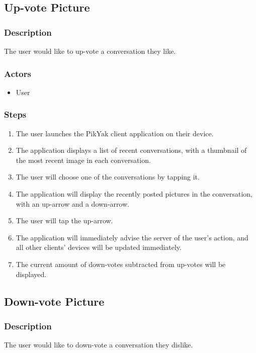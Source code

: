 \documentclass[11pt]{scrartcl}
\begin{document}
    \subsection{Up-vote Picture}
        \subsubsection{Description}
            The user would like to up-vote a conversation they like.
        \subsubsection{Actors}
            \begin{itemize}
                \item User
            \end{itemize}
        \subsubsection{Steps}
            \begin{enumerate}
                \item The user launches the PikYak client application on their device.
                \item The application displays a list of recent conversations, with a thumbnail of the most recent image in each conversation.
                \item The user will choose one of the conversations by tapping it.
                \item The application will display the recently posted pictures in the conversation, with an up-arrow and a down-arrow.
                \item The user will tap the up-arrow.
                \item The application will immediately advise the server of the user's action, and all other clients' devices will be updated immediately.
                \item The current amount of down-votes subtracted from up-votes will be displayed.
            \end{enumerate}

    \subsection{Down-vote Picture}
        \subsubsection{Description}
            The user would like to down-vote a conversation they dislike.
\end{document}
